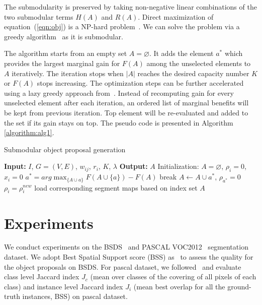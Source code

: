 \documentclass[10pt,twocolumn,letterpaper]{article}
\begin{document}
The submodularity is preserved by taking non-negative linear combinations of the two submodular terms $H(A)$ and $R(A)$. Direct maximization of equation~(\ref{eqn:obj}) is a NP-hard problem~\cite{Galvao04}. We can solve the problem via a greedy algorithm~\cite{Galvao04,Nemhauser78} as it is submodular. 

The algorithm starts from an empty set $A=\varnothing$. It adds the element $a^*$ which provides the largest marginal gain for $F(A)$ among the unselected elements to $A$ iteratively. The iteration stops when $|A|$ reaches the desired capacity number $K$ or $F(A)$ stops increasing. The optimization steps can be further accelerated using a lazy greedy approach from~\cite{Leskovec07}. Instead of recomputing gain for every unselected element after each iteration, an ordered list of marginal benefits will be kept from previous iteration. Top element will be re-evaluated and added to the set if its gain stays on top. The pseudo code is presented in Algorithm \ref{algorithm:alg1}.

%
\begin{algorithm}
  \caption{Submodular object proposal generation}
  \label{algorithm:alg1}
  \begin{algorithmic}
  	\State \textbf{Input:} $I$, $G=(V,E)$, $w_{ij}$, $r_i$, $K$, $\lambda$
  	\State \textbf{Output:} $A$ 
  	\State Initialization: $A=\varnothing$, $\rho _i=0$, $x_i=0$
    \State $a^*=arg\max_{\{A\cup a\}} F(A\cup \{a\})-F(A)$
    \State break
    \EndIf
    \State $A \leftarrow A\cup {a^*}$, $\rho_{a^*}=0$
    	\State $\rho_i=\rho_i^{new}$
    	\EndFor
    \EndWhile  
    \State load corresponding segment maps based on index set $A$
  \end{algorithmic}
\end{algorithm} 

%
\section{Experiments}
We conduct experiments on the BSDS~\cite{Martin02} and PASCAL VOC2012~\cite{pascal-voc-2012} segmentation dataset. We adopt Best Spatial Support score (BSS) as~\cite{Endres14} to assess the quality for the object proposals on BSDS. For pascal dataset, we followed~\cite{Arbelaez14} and evaluate class level Jaccard index $J_c$ (mean over classes of the covering of all pixels of each class) and instance level Jaccard index $J_i$ (mean best overlap for all the ground-truth instances, BSS) on pascal dataset. 
\end{document}
